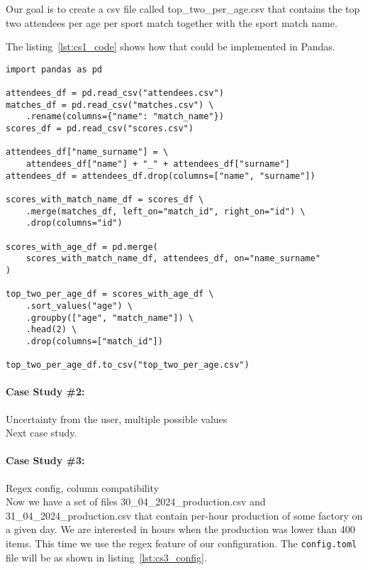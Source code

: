 Our goal is to create a csv file called top\_two\_per\_age.csv that contains the top two attendees per age per sport match
together with the sport match name.

The listing~\ref{lst:cs1_code} shows how that could be implemented in Pandas.

\begin{lstlisting}[caption=Solution of the first case study in Pandas, label={lst:cs1_code}, captionpos=b]
import pandas as pd

attendees_df = pd.read_csv("attendees.csv")
matches_df = pd.read_csv("matches.csv") \
    .rename(columns={"name": "match_name"})
scores_df = pd.read_csv("scores.csv")

attendees_df["name_surname"] = \
    attendees_df["name"] + "_" + attendees_df["surname"]
attendees_df = attendees_df.drop(columns=["name", "surname"])

scores_with_match_name_df = scores_df \
    .merge(matches_df, left_on="match_id", right_on="id") \
    .drop(columns="id")

scores_with_age_df = pd.merge(
    scores_with_match_name_df, attendees_df, on="name_surname"
)

top_two_per_age_df = scores_with_age_df \
    .sort_values("age") \
    .groupby(["age", "match_name"]) \
    .head(2) \
    .drop(columns=["match_id"])

top_two_per_age_df.to_csv("top_two_per_age.csv")
\end{lstlisting}



\paragraph{Case Study \#2:} Uncertainty from the user, multiple possible values \\

Next case study.


\paragraph{Case Study \#3:} Regex config, column compatibility \\

Now we have a set of files 30\_04\_2024\_production.csv and 31\_04\_2024\_production.csv that contain per-hour production
of some factory on a given day.
We are interested in hours when the production was lower than 400 items.
This time we use the regex feature of our configuration.
The \verb|config.toml| file will be as shown in listing~\ref{lst:cs3_config}.

